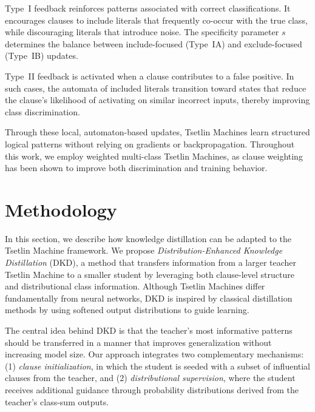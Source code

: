 \documentclass[sn-mathphys-num]{sn-jnl}%
\theoremstyle{thmstyleone}%
\theoremstyle{thmstyletwo}%
\theoremstyle{thmstylethree}%
\begin{document}
Type~I feedback reinforces patterns associated with correct classifications. It encourages clauses to include literals that frequently co-occur with the true class, while discouraging literals that introduce noise. The specificity parameter $s$ determines the balance between include-focused (Type~IA) and exclude-focused (Type~IB) updates.

Type~II feedback is activated when a clause contributes to a false positive. In such cases, the automata of included literals transition toward states that reduce the clause's likelihood of activating on similar incorrect inputs, thereby improving class discrimination.

Through these local, automaton-based updates, Tsetlin Machines learn structured logical patterns without relying on gradients or backpropagation. Throughout this work, we employ weighted multi-class Tsetlin Machines, as clause weighting has been shown to improve both discrimination and training behavior.


\section{Methodology}
In this section, we describe how knowledge distillation can be adapted to the Tsetlin Machine framework. We propose \textit{Distribution-Enhanced Knowledge Distillation} (DKD), a method that transfers information from a larger teacher Tsetlin Machine to a smaller student by leveraging both clause-level structure and distributional class information. Although Tsetlin Machines differ fundamentally from neural networks, DKD is inspired by classical distillation methods by using softened output distributions to guide learning.

The central idea behind DKD is that the teacher's most informative patterns should be transferred in a manner that improves generalization without increasing model size. Our approach integrates two complementary mechanisms: (1) \textit{clause initialization}, in which the student is seeded with a subset of influential clauses from the teacher, and (2) \textit{distributional supervision}, where the student receives additional guidance through probability distributions derived from the teacher's class-sum outputs.
\end{document}
